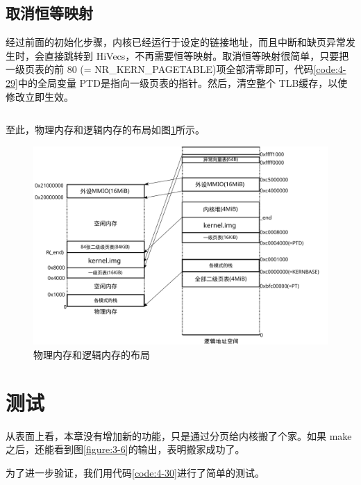 \documentclass[main.tex]{subfiles}
\begin{document}
\begin{CJK*}{UTF8}{song}
\subsection{取消恒等映射}
经过前面的初始化步骤，内核已经运行于设定的链接地址，而且中断和缺页异常发生时，会直接跳转到 Hi\-Vecs，不再需要恒等映射。取消恒等映射很简单，只要把一级页表的前 80 (= NR\_\-KERN\_\-PAGE\-TABLE)项全部清零即可，代码\ref{code:4-29}中的全局变量 PTD是指向一级页表的指针。然后，清空整个 TLB缓存，以使修改立即生效。

\begin{code}
\label{code:4-29}
\inputminted[firstline=406,lastline=418,linenos,numbersep=5pt,frame=lines,framesep=2mm]{c}{src/chapter04/kernel/machdep.c}
\end{code}

至此，物理内存和逻辑内存的布局如图\ref{figure:4-9}所示。

\begin{figure}[htp]
\centering
\includegraphics[scale=0.4]{figures/4-9}
\caption{物理内存和逻辑内存的布局}
\label{figure:4-9}
\end{figure}

\section{测试}
从表面上看，本章没有增加新的功能，只是通过分页给内核搬了个家。如果 make之后，还能看到图\ref{figure:3-6}的输出，表明搬家成功了。

\par
为了进一步验证，我们用代码\ref{code:4-30}进行了简单的测试。

\begin{code}
\label{code:4-30}
\inputminted[firstline=448,lastline=458,linenos,numbersep=5pt,frame=lines,framesep=2mm]{c}{src/chapter04/kernel/machdep.c}
\end{code}


\end{CJK*}
\end{document}
